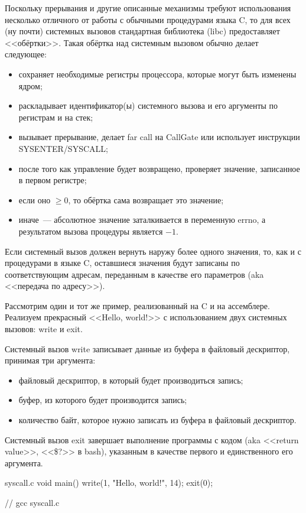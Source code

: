 Поскольку прерывания и другие описанные механизмы требуют использования несколько отличного от работы с обычными процедурами языка C, то для всех (ну почти) системных вызовов стандартная библиотека (libc) предоставляет <<обёртки>>.
Такая обёртка над системным вызовом обычно делает следующее:
\begin{itemize}
    \item сохраняет необходимые регистры процессора, которые могут быть изменены ядром;
    \item раскладывает идентификатор(ы) системного вызова и его аргументы по регистрам и на стек;
    \item вызывает прерывание, делает far call на CallGate или использует инструкции SYSENTER/SYSCALL;
    \item после того как управление будет возвращено, проверяет значение, записанное в первом регистре;
    \item если оно $\geq 0$, то обёртка сама возвращает это значение;
    \item иначе~--- абсолютное значение заталкивается в переменную errno, а результатом вызова процедуры является $-1$.
\end{itemize}

Если системный вызов должен вернуть наружу более одного значения, то, как и с процедурами в языке C, оставшиеся значения будут записаны по соответствующим адресам, переданным в качестве его параметров (aka <<передача по адресу>>).

Рассмотрим один и тот же пример, реализованный на C и на ассемблере.
Реализуем прекрасный <<Hello, world!>> с использованием двух системных вызовов: write и exit.

Системный вызов write записывает данные из буфера в файловый дескриптор, принимая три аргумента:
\begin{itemize}
    \item файловый дескриптор, в который будет производиться запись;
    \item буфер, из которого будет производится запись;
    \item количество байт, которое нужно записать из буфера в файловый дескриптор.
\end{itemize}

Системный вызов exit завершает выполнение программы с кодом (aka <<return value>>, <<\$?>> в bash), указанным в качестве первого и единственного его аргумента.

\begin{ccode}{syscall.c}
void main()
{
    write(1, "Hello, world!\n", 14);
    exit(0);
}

// gcc syscall.c
\end{ccode}

